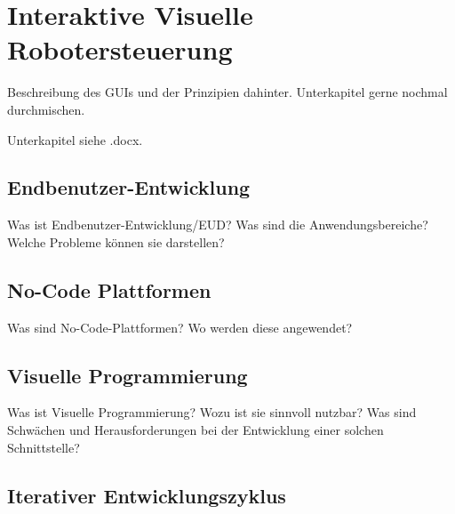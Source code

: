 \chapter{Interaktive Visuelle Robotersteuerung} %
Beschreibung des GUIs und der Prinzipien dahinter. Unterkapitel gerne nochmal durchmischen.

Unterkapitel siehe .docx.

\section{Endbenutzer-Entwicklung} %
Was ist Endbenutzer-Entwicklung/EUD? Was sind die Anwendungsbereiche? Welche Probleme können sie darstellen? 

\section{No-Code Plattformen} %
Was sind No-Code-Plattformen? Wo werden diese angewendet?

\section{Visuelle Programmierung} %
Was ist Visuelle Programmierung? Wozu ist sie sinnvoll nutzbar? Was sind Schwächen und Herausforderungen bei der Entwicklung einer solchen Schnittstelle?

\section{Iterativer Entwicklungszyklus} %